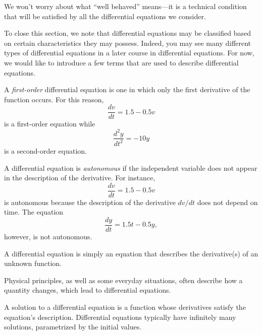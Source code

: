 \vspace*{5pt}
\nin {}
\vspace*{1pt}

We won't worry about what ``well behaved'' means---it is a technical
condition that will be satisfied by all the differential equations we
consider. 

To close this section, we note that differential equations may be
classified based on certain characteristics they may possess.  Indeed,
you may see many different types of differential equations in a
later course in differential equations.  For now, we would like to
introduce a few terms that are used to describe differential
equations.

A {\em first-order} differential equation is one in which only the
first derivative of the function occurs.  For this reason,
$$
\frac{dv}{dt} = 1.5-0.5v
$$
is a first-order equation while
$$
\frac{d^2 y}{dt^2} = -10y
$$
is a second-order equation.

A differential equation is {\em autonomous}  if the independent
variable does not appear in the description of the derivative.  
For instance,
$$
\frac{dv}{dt} = 1.5-0.5v
$$
is autonomous because the description of the derivative $dv/dt$ does
not depend on time.   
The equation
$$
\frac{dy}{dt} = 1.5t - 0.5y,
$$
however, is not autonomous.

\newpage

\begin{summary}
\item A differential equation is simply an equation that describes the
  derivative(s) of an unknown function.
\item Physical principles, as well as some everyday situations, often
  describe how a quantity changes, which 
  lead to differential equations.
\item A solution to a differential equation is a function whose
  derivatives satisfy the equation's description.  Differential
  equations typically have infinitely many solutions, 
  parametrized by the initial values.
\end{summary}

\nin \hrulefill

 



\clearpage

